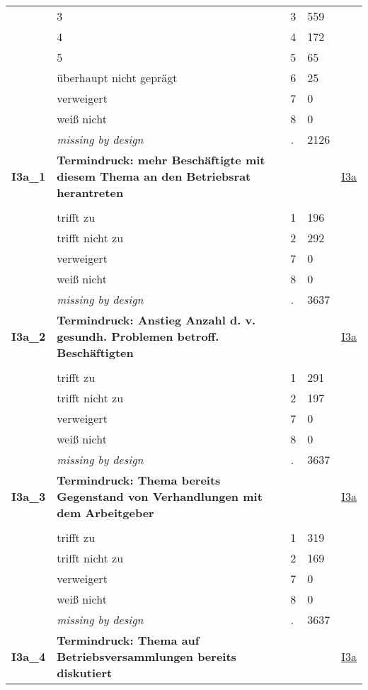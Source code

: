\begin{longtable}{| L{2.65cm} | L{8cm} | C{1.5cm} | R{1.25cm} | C{2.25cm}  |}
   & 3 & 3 & 559 &  \\ 
   & 4 & 4 & 172 &  \\ 
   & 5 & 5 & 65 &  \\ 
   & überhaupt nicht geprägt & 6 & 25 &  \\ 
   & verweigert & 7 & 0 &  \\ 
   & weiß nicht & 8 & 0 &  \\ 
   & \textit{missing by design} & \textit{.} & 2126 &  \\ 
   \midrule
\textbf{I3a\_1}\label{var:I3a:1} & \textbf{Termindruck: mehr Beschäftigte mit diesem Thema an den Betriebsrat herantreten} &  &  & \hyperref[I3a]{I3a} \\ 
   &  &  &  &  \\ 
   & trifft zu & 1 & 196 &  \\ 
   & trifft nicht zu & 2 & 292 &  \\ 
   & verweigert & 7 & 0 &  \\ 
   & weiß nicht & 8 & 0 &  \\ 
   & \textit{missing by design} & \textit{.} & 3637 &  \\ 
   \midrule
\textbf{I3a\_2}\label{var:I3a:2} & \textbf{Termindruck: Anstieg Anzahl d. v. gesundh. Problemen betroff. Beschäftigten} &  &  & \hyperref[I3a]{I3a} \\ 
   &  &  &  &  \\ 
   & trifft zu & 1 & 291 &  \\ 
   & trifft nicht zu & 2 & 197 &  \\ 
   & verweigert & 7 & 0 &  \\ 
   & weiß nicht & 8 & 0 &  \\ 
   & \textit{missing by design} & \textit{.} & 3637 &  \\ 
   \midrule
\textbf{I3a\_3}\label{var:I3a:3} & \textbf{Termindruck: Thema bereits Gegenstand von Verhandlungen mit dem Arbeitgeber} &  &  & \hyperref[I3a]{I3a} \\ 
   &  &  &  &  \\ 
   & trifft zu & 1 & 319 &  \\ 
   & trifft nicht zu & 2 & 169 &  \\ 
   & verweigert & 7 & 0 &  \\ 
   & weiß nicht & 8 & 0 &  \\ 
   & \textit{missing by design} & \textit{.} & 3637 &  \\ 
   \midrule
\textbf{I3a\_4}\label{var:I3a:4} & \textbf{Termindruck: Thema auf Betriebsversammlungen bereits diskutiert} &  &  & \hyperref[I3a]{I3a} \\ 

\end{longtable}
